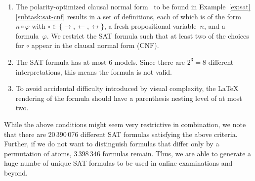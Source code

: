 \begin{enumerate}
    \item
        The polarity-optimized clausal normal form~\cite{Tseytin70} 
        to be found in Example~\ref{ex:sat}\ref{subtask:sat-cnf} results in a set of definitions,
        each of which is of the form
        $n \circ \varphi$ with $\circ \in \{ \rightarrow, \leftarrow, \leftrightarrow \}$,
        a fresh propositional variable~$n$, and a formula~$\varphi$.
        We restrict the SAT formula such that at least two of the choices for
        $\circ$ appear in the clausal normal form (CNF).
    \item
        The SAT formula has at most $6$ models.
        Since there are $2^3 = 8$ different interpretations,
        this means the formula is not valid.
    \item
        To avoid accidental difficulty introduced by visual complexity,
        the \LaTeX{} rendering of the formula should have a parenthesis nesting level of at most two.
\end{enumerate}

While the above conditions might seem very restrictive in combination,
we note that 
there are $20\,390\,076$ different SAT formulas satisfying the above
criteria. Further, 
if we do not want to distinguish formulas that differ only by a permutation of atoms,
$3\,398\,346$ formulas remain. Thus, we are able to generate a huge
numbe of unique SAT formulas to be used in online examinations and
beyond.



